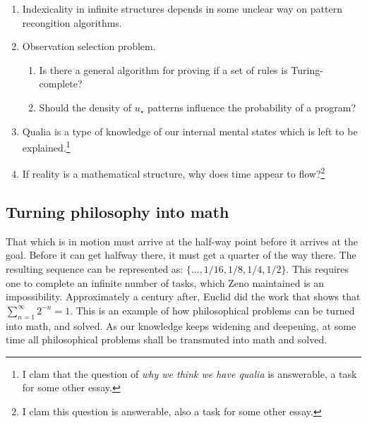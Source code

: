 \documentclass[oneside,hidelinks]{article}
\begin{document}
\vspace{10px}

\begin{enumerate}
\item Indexicality in infinite structures depends in some unclear way on pattern recongition algorithms.
\item Observation selection problem.
\begin{enumerate}
\item Is there a general algorithm for proving if a set of rules is Turing-complete?
\item Should the density of $u_\star$ patterns influence the probability of a program?
\end{enumerate}
\item Qualia is a type of knowledge of our internal mental states which is left to be explained.\footnote{
I clam that the question of \textit{why we think we have qualia} is answerable, a task for some other essay.
}
\item If reality is a mathematical structure, why does time appear to flow?\footnote{
I clam this question is answerable, also a task for some other essay.
}
\end{enumerate}

\newpage

\subsection{Turning philosophy into math}

That which is in motion must arrive at the half-way point before it arrives at the goal.
Before it can get halfway there, it must get a quarter of the way there.
The resulting sequence can be represented as: $\{..., 1/16, 1/8, 1/4, 1/2\}$.
This requires one to complete an infinite number of tasks, which Zeno maintained is an impossibility.
Approximately a century after, Euclid did the work that shows that $\sum_{n=1}^{\infty} 2^{-n} = 1$.
This is an example of how philosophical problems can be turned into math, and solved.
As our knowledge keeps widening and deepening, at some time all philosophical problems shall be transmuted into math and solved.

\newpage
\end{document}

